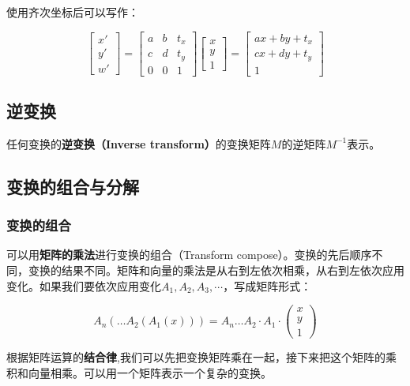 \documentclass[openany]{progbookcn}
\begin{document}
使用齐次坐标后可以写作：

\begin{equation}
	\begin{bmatrix}x'\\y'\\w'\end{bmatrix}=\begin{bmatrix}a&b&t_x\\c&d&t_y\\0&0&1\end{bmatrix}\begin{bmatrix}x\\y\\1\end{bmatrix}=\begin{bmatrix}ax+by+t_x\\cx+dy+t_y\\1\end{bmatrix}
\end{equation}

\subsection{逆变换}

任何变换的\textbf{逆变换（Inverse transform）}的变换矩阵$M$的逆矩阵$M^{-1}$表示。

\subsection{变换的组合与分解}

\subsubsection{变换的组合}

可以用\textbf{矩阵的乘法}进行变换的组合（Transform compose）。变换的先后顺序不同，变换的结果不同。矩阵和向量的乘法是从右到左依次相乘，从右到左依次应用变化。如果我们要依次应用变化$A_1,A_2,A_3,\cdots$，写成矩阵形式：

\begin{equation}
	A_n(\dots A_2(A_1(x)))=A_n\dots A_2\cdot A_1\cdot \begin{pmatrix}x\\y\\1\end{pmatrix}
\end{equation}

根据矩阵运算的\textbf{结合律},我们可以先把变换矩阵乘在一起，接下来把这个矩阵的乘积和向量相乘。可以用一个矩阵表示一个复杂的变换。
\end{document}
